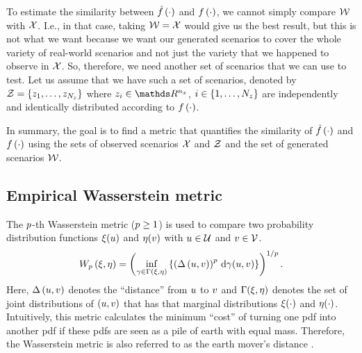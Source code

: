 To estimate the similarity between $\hat{f}\left( \cdot \right)$ and $f\left( \cdot \right)$, we cannot simply compare $\mathcal{W}$ with $\mathcal{X}$.
I.e., in that case, taking $\mathcal{W}=\mathcal{X}$ would give us the best result, but this is not what we want because we want our generated scenarios to cover the whole variety of real-world scenarios and not just the variety that we happened to observe in $\mathcal{X}$.
So, therefore, we need another set of scenarios that we can use to test.
Let us assume that we have such a set of scenarios, denoted by $\mathcal{Z} = \{z_{1},\ldots,z_{N_z}\}$ where $\scenarioparstest_{\scenarioindex} \in \realnumbers^{\dimensionscenariopars}$, $i \in \{1, \ldots, N_z\}$ are independently and identically distributed according to $f\left( \cdot \right)$.

In summary, the goal is to find a metric that quantifies the similarity of $\hat{f}\left( \cdot \right)$ and $f\left( \cdot \right)$ using the sets of observed scenarios $\mathcal{X}$ and $\mathcal{Z}$ and the set of generated scenarios $\mathcal{W}$.



\subsection{Empirical Wasserstein metric}
\label{sec:wasserstein}

The $p$-th Wasserstein metric ($p \geq 1$) is used to compare two probability distribution functions $\xi(u)$ and $\eta(v)$ with $u\in\mathcal{U}$ and $v\in\mathcal{V}$.
\begin{equation}
	\label{eq:wasserstein}
	W_{p}\left(\xi,\eta\right)
	= \left( 
		\inf_{\gamma \in \Gamma(\xi,\eta)}
		\left\{ 
			\left( \Delta\left(u,v\right) \right)^{p} 
			\,\mathrm{d} \gamma(u,v)
		\right\}
	\right)^{1/p}.
\end{equation}
Here, $\Delta\left(u,v\right)$ denotes the ``distance'' from $u$ to $v$ and $\Gamma(\xi,\eta)$ denotes the set of joint distributions of $(u, v)$ that has that marginal distributions $\xi(\cdot)$ and $\eta(\cdot)$. 
Intuitively, this metric calculates the minimum ``cost'' of turning one \ac{pdf} into another \ac{pdf} if these \acp{pdf} are seen as a pile of earth with equal mass. 
Therefore, the Wasserstein metric is also referred to as the earth mover's distance \autocite{rubner2000emd}.

